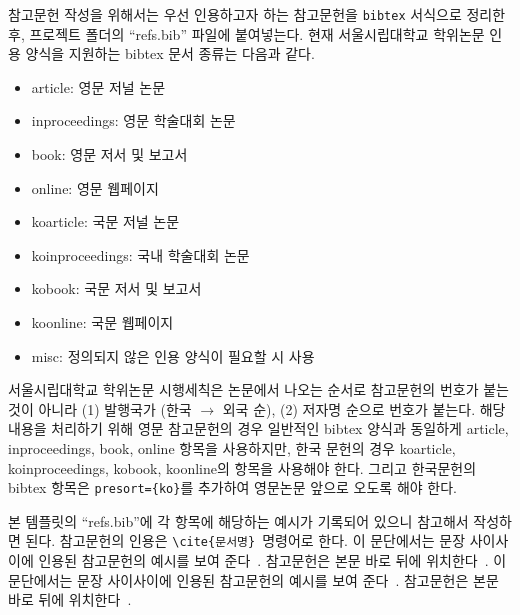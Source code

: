 \documentclass[ko]{UOSThesis}
\begin{document}
참고문헌 작성을 위해서는 우선 인용하고자 하는 참고문헌을 \texttt{bibtex} 서식으로 정리한 후, 프로젝트 폴더의 ``refs.bib'' 파일에 붙여넣는다. 현재 서울시립대학교 학위논문 인용 양식을 지원하는 bibtex 문서 종류는 다음과 같다.
\begin{itemize}
\singlespacing
\small
    \item article: 영문 저널 논문
    \item inproceedings: 영문 학술대회 논문
    \item book: 영문 저서 및 보고서
    \item online: 영문 웹페이지
    \item koarticle: 국문 저널 논문
    \item koinproceedings: 국내 학술대회 논문
    \item kobook: 국문 저서 및 보고서
    \item koonline: 국문 웹페이지
    \item misc: 정의되지 않은 인용 양식이 필요할 시 사용
\end{itemize}

서울시립대학교 학위논문 시행세칙은 논문에서 나오는 순서로 참고문헌의 번호가 붙는 것이 아니라 (1) 발행국가 (한국 $\to$ 외국 순), (2) 저자명 순으로 번호가 붙는다. 해당 내용을 처리하기 위해 영문 참고문헌의 경우 일반적인 bibtex 양식과 동일하게 article, inproceedings, book, online 항목을 사용하지만, 한국 문헌의 경우 koarticle, koinproceedings, kobook, koonline의 항목을 사용해야 한다. 그리고 한국문헌의 bibtex 항목은 \texttt{presort=\{ko\}}를 추가하여 영문논문 앞으로 오도록 해야 한다.

본 템플릿의 ``refs.bib''에 각 항목에 해당하는 예시가 기록되어 있으니 참고해서 작성하면 된다. 참고문헌의 인용은 \texttt{\textbackslash cite\{문서명\}}~명령어로 한다. 이 문단에서는 문장 사이사이에 인용된 참고문헌의 예시를 보여 준다~\cite{ahmed_smart-anomaly-detection_2023, akcay_ganomaly_2018, an_canopen_2017}. 참고문헌은 본문 바로 뒤에 위치한다~\cite{sinha_vibration_2015, park_image_2024, sharma_bearing_2018}. 이 문단에서는 문장 사이사이에 인용된 참고문헌의 예시를 보여 준다~\cite{mfpt, kang_easy}. 참고문헌은 본문 바로 뒤에 위치한다~\cite{lee_embedded_2023}.

\clearpage
{}
\printbibliography[
  title=\bibloname,
  heading=bibintoc
]
\newpage

\begin{BackAbstract}
    
\end{BackAbstract}

\begin{KoreanAcknowledgement}
    
\end{KoreanAcknowledgement}
\end{document}
